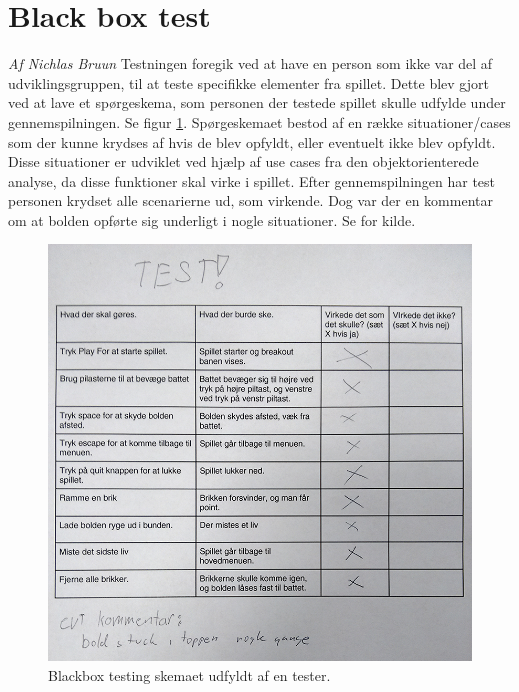 
\section{Black box test}
\textit{Af Nichlas Bruun}\newline
Testningen foregik ved at have en person som ikke var del af udviklingsgruppen, til at teste specifikke elementer fra spillet. Dette blev gjort ved at lave et spørgeskema, som personen der testede spillet skulle udfylde under gennemspilningen. Se figur \ref{dia:blackbox1}. Spørgeskemaet bestod af en række situationer/cases som der kunne krydses af hvis de blev opfyldt, eller eventuelt ikke blev opfyldt. Disse situationer er udviklet ved hjælp af use cases fra den objektorienterede analyse, da disse funktioner skal virke i spillet. Efter gennemspilningen har test personen krydset alle scenarierne ud, som virkende. Dog var der en kommentar om at bolden opførte sig underligt i nogle situationer. \newline \newline
Se \cite[p. 33-58]{Williams2011} for kilde.

\begin{figure}
	\begin{center}
		\caption{Blackbox testing skemaet udfyldt af en tester.}
		\label{dia:blackbox1}
		\includegraphics[width=0.98\linewidth]{pictures/testing/BlackboxTestArkBilag}
		\end{center}
\end{figure}